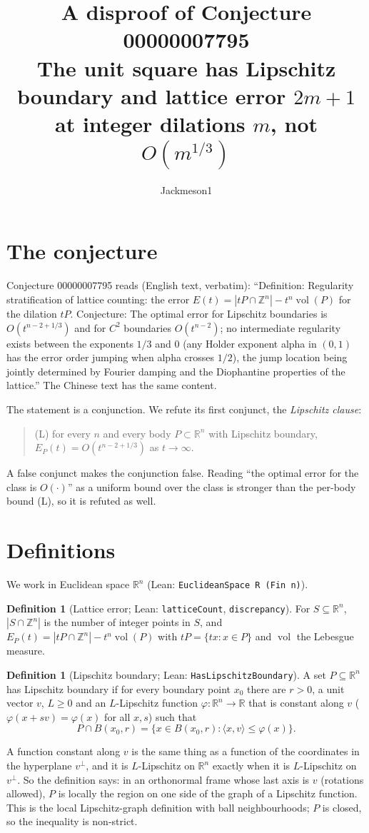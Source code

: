 \documentclass[11pt]{article}
\title{A disproof of Conjecture 00000007795\\[2pt]
\large The unit square has Lipschitz boundary and lattice error $2m+1$ at integer dilations $m$, not $O(m^{1/3})$}
\author{Jackmeson1}
\date{}
\renewcommand{\_}{\oldus\allowbreak}
\theoremstyle{definition}
\newtheorem{definition}[theorem]{Definition}
\theoremstyle{remark}
\begin{document}
\maketitle

\section{The conjecture}
Conjecture 00000007795 reads (English text, verbatim): ``Definition: Regularity stratification of
lattice counting: the error $E(t) = |tP \cap \mathbb Z^n| - t^n \operatorname{vol}(P)$ for the
dilation $tP$. Conjecture: The optimal error for Lipschitz boundaries is $O(t^{n-2+1/3})$ and for
$C^2$ boundaries $O(t^{n-2})$; no intermediate regularity exists between the exponents $1/3$ and $0$
(any Holder exponent alpha in $(0,1)$ has the error order jumping when alpha crosses $1/2$), the jump
location being jointly determined by Fourier damping and the Diophantine properties of the
lattice.'' The Chinese text has the same content.

The statement is a conjunction. We refute its first conjunct, the \emph{Lipschitz clause}:
\begin{quote}
(L) for every $n$ and every body $P\subset\mathbb R^n$ with Lipschitz boundary,
$E_P(t)=O(t^{n-2+1/3})$ as $t\to\infty$.
\end{quote}
A false conjunct makes the conjunction false. Reading ``the optimal error for the class is
$O(\cdot)$'' as a uniform bound over the class is stronger than the per-body bound (L), so it is
refuted as well.

\section{Definitions}
We work in Euclidean space $\mathbb R^n$ (Lean: \texttt{EuclideanSpace R (Fin n)}).
\begin{definition}[Lattice error; Lean: \texttt{latticeCount}, \texttt{discrepancy}]
For $S\subseteq\mathbb R^n$, $|S\cap\mathbb Z^n|$ is the number of integer points in $S$, and
$E_P(t)=|tP\cap\mathbb Z^n|-t^n\operatorname{vol}(P)$ with $tP=\{tx:x\in P\}$ and
$\operatorname{vol}$ the Lebesgue measure.
\end{definition}
\begin{definition}[Lipschitz boundary; Lean: \texttt{HasLipschitzBoundary}]
A set $P\subseteq\mathbb R^n$ has Lipschitz boundary if for every boundary point $x_0$ there are
$r>0$, a unit vector $v$, $L\ge0$ and an $L$-Lipschitz function $\varphi:\mathbb R^n\to\mathbb R$
that is constant along $v$ ($\varphi(x+sv)=\varphi(x)$ for all $x,s$) such that
\[P\cap B(x_0,r)=\{x\in B(x_0,r): \langle x,v\rangle\le\varphi(x)\}.\]
\end{definition}
A function constant along $v$ is the same thing as a function of the coordinates in the hyperplane
$v^\perp$, and it is $L$-Lipschitz on $\mathbb R^n$ exactly when it is $L$-Lipschitz on $v^\perp$.
So the definition says: in an orthonormal frame whose last axis is $v$ (rotations allowed), $P$ is
locally the region on one side of the graph of a Lipschitz function. This is the local
Lipschitz-graph definition with ball neighbourhoods; $P$ is closed, so the inequality is
non-strict.
\end{document}
